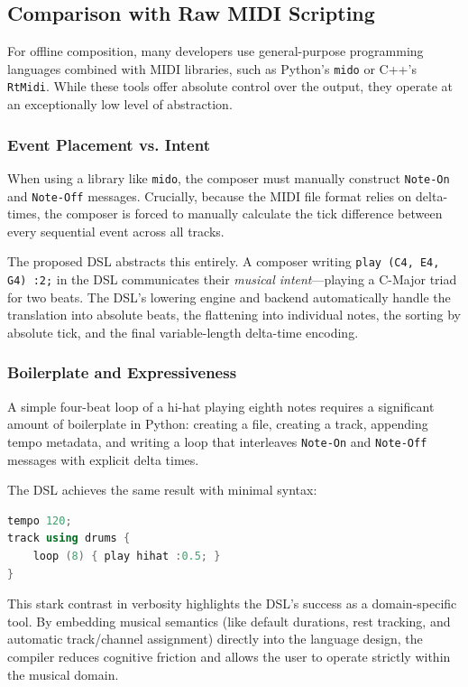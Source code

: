 \subsection{Comparison with Raw MIDI Scripting}

For offline composition, many developers use general-purpose programming languages combined with MIDI
libraries, such as Python's \texttt{mido} or C++'s \texttt{RtMidi}.
While these tools offer absolute control over the output, they operate at an exceptionally low level of abstraction.

\subsubsection{Event Placement vs. Intent}
When using a library like \texttt{mido}, the composer must manually construct \texttt{Note-On} and
\texttt{Note-Off} messages.
Crucially, because the MIDI file format relies on delta-times, the composer is forced to manually calculate
the tick difference between every sequential event across all tracks.

The proposed DSL abstracts this entirely.
A composer writing \texttt{play (C4, E4, G4) :2;} in the DSL communicates their \textit{musical
intent}---playing a C-Major triad for two beats.
The DSL's lowering engine and backend automatically handle the translation into absolute beats, the
flattening into individual notes, the sorting by absolute tick, and the final variable-length delta-time encoding.

\subsubsection{Boilerplate and Expressiveness}
A simple four-beat loop of a hi-hat playing eighth notes requires a significant amount of boilerplate in
Python: creating a file, creating a track, appending tempo metadata, and writing a loop that interleaves
\texttt{Note-On} and \texttt{Note-Off} messages with explicit delta times.

The DSL achieves the same result with minimal syntax:
\begin{lstlisting}[language=C++]
tempo 120;
track using drums {
    loop (8) { play hihat :0.5; }
}
\end{lstlisting}

This stark contrast in verbosity highlights the DSL's success as a domain-specific tool. By embedding musical
semantics (like default durations, rest tracking, and automatic track/channel assignment) directly into the
language design, the compiler reduces cognitive friction and allows the user to operate strictly within the
musical domain.
